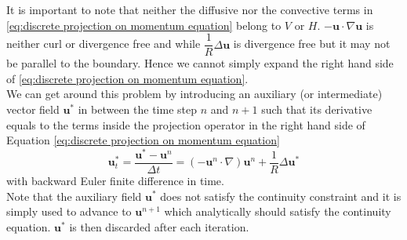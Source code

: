 It is important to note that neither the diffusive nor the convective terms in \eqref{eq:discrete projection on momentum equation} belong to $\textit{V}$ or $\textit{H}$. $-\textbf{u} \cdot \nabla \textbf{u}$ is neither curl or divergence free and while $\dfrac{1}{R} \Delta \textbf{u}$ is divergence free but it may not be parallel to the boundary. Hence we cannot simply expand the right hand side of \eqref{eq:discrete projection on momentum equation}.\\
We can get around this problem by introducing an auxiliary (or intermediate) vector field $\textbf{u}^*$ in between the time step $n$ and $n+1$ such that its derivative equals to the terms inside the projection operator in the right hand side of Equation \eqref{eq:discrete projection on momentum equation}\\
\begin{dmath}\label{eq:definition of intermediate velocity field}
\textbf{u}^*_t = \dfrac{\textbf{u}^* - \textbf{u}^n}{\Delta t} = (-\textbf{u}^{n} \cdot \nabla) \textbf{u}^{n} + \dfrac{1}{R} \Delta \textbf{u}^*
\end{dmath}
with backward Euler finite difference in time.\\
Note that the auxiliary field $\textbf{u}^*$ does not satisfy the continuity constraint and it is simply used to advance to $\textbf{u}^{n+1}$ which analytically should satisfy the continuity equation. $\textbf{u}^*$ is then discarded after each iteration.
